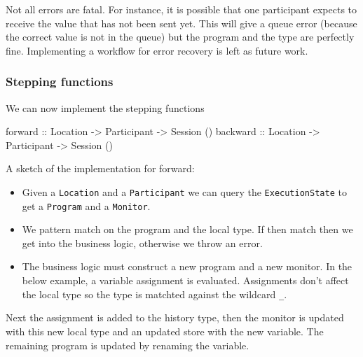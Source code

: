\documentclass[runningheads]{llncs}
\providecommand{\tightlist}{%
  \setlength{\itemsep}{0pt}\setlength{\parskip}{0pt}}
\newenvironment{Shaded}{}{}
\newcommand{\DataTypeTok}[1]{\textcolor[rgb]{0.56,0.13,0.00}{#1}}
\newcommand{\OtherTok}[1]{\textcolor[rgb]{0.00,0.44,0.13}{#1}}
\newcommand{\NormalTok}[1]{#1}
\begin{document}
Not all errors are fatal. For instance, it is possible that one
participant expects to receive the value that has not been sent yet.
This will give a queue error (because the correct value is not in the
queue) but the program and the type are perfectly fine. Implementing a
workflow for error recovery is left as future work.

\subsubsection{Stepping functions}\label{stepping-functions}

We can now implement the stepping functions

\begin{Shaded}
\begin{Highlighting}[]
\OtherTok{forward ::} \DataTypeTok{Location} \OtherTok{->} \DataTypeTok{Participant} \OtherTok{->} \DataTypeTok{Session}\NormalTok{ ()}
\OtherTok{backward ::} \DataTypeTok{Location} \OtherTok{->} \DataTypeTok{Participant} \OtherTok{->} \DataTypeTok{Session}\NormalTok{ ()}
\end{Highlighting}
\end{Shaded}

A sketch of the implementation for forward:

\begin{itemize}
\tightlist
\item
  Given a \texttt{Location} and a \texttt{Participant} we can query the
  \texttt{ExecutionState} to get a \texttt{Program} and a
  \texttt{Monitor}.
\item
  We pattern match on the program and the local type. If then match then
  we get into the business logic, otherwise we throw an error.
\item
  The business logic must construct a new program and a new monitor. In
  the below example, a variable assignment is evaluated. Assignments
  don't affect the local type so the type is matchted against the
  wildcard \texttt{\_}.
\end{itemize}

Next the assignment is added to the history type, then the monitor is
updated with this new local type and an updated store with the new
variable. The remaining program is updated by renaming the variable.
\end{document}
